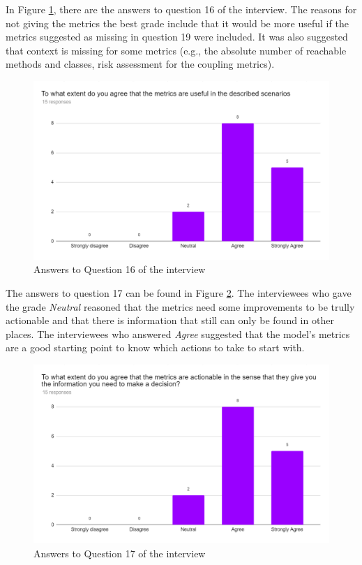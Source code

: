 In Figure \ref{fig:interview-16}, there are the answers to question 16 of the interview. The reasons for not giving the metrics the best grade include that it would be more useful if the metrics suggested as missing in question 19 were included. It was also suggested that context is missing for some metrics (e.g., the absolute number of reachable methods and classes, risk assessment for the coupling metrics).

\begin{figure}[ht!]
\begin{center}
\includegraphics[width=\textwidth]{figures/interview/Question16.png}
\caption{Answers to Question 16 of the interview}
\label{fig:interview-16}
\end{center}
\end{figure}

The answers to question 17 can be found in Figure \ref{fig:interview-17}. The interviewees who gave the grade \textit{Neutral} reasoned that the metrics need some improvements to be trully actionable and that there is information that still can only be found in other places. The interviewees who answered \textit{Agree} suggested that the model's metrics are a good starting point to know which actions to take to start with.

\begin{figure}[ht!]
\begin{center}
\includegraphics[width=\textwidth]{figures/interview/Question17.png}
\caption{Answers to Question 17 of the interview}
\label{fig:interview-17}
\end{center}
\end{figure}

